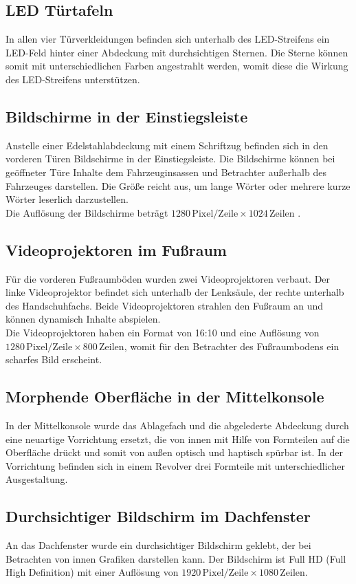 \subsection{LED Türtafeln}
In allen vier Türverkleidungen befinden sich unterhalb des LED-Streifens ein LED-Feld hinter einer Abdeckung mit durchsichtigen Sternen. Die Sterne können somit mit unterschiedlichen Farben angestrahlt werden, womit diese die Wirkung des LED-Streifens unterstützen. \\
\subsection{Bildschirme in der Einstiegsleiste}
Anstelle einer Edelstahlabdeckung mit einem Schriftzug befinden sich in den vorderen Türen Bildschirme in der Einstiegsleiste. Die Bildschirme können bei geöffneter Türe Inhalte dem Fahrzeuginsassen und Betrachter außerhalb des Fahrzeuges darstellen. Die Größe reicht aus, um lange Wörter oder mehrere kurze Wörter leserlich darzustellen. \\
Die Auflösung der Bildschirme beträgt $ 1280 \,\mathrm{Pixel}/\mathrm{Zeile} \times 1024 \,\mathrm{Zeilen} $ . 
\subsection{Videoprojektoren im Fußraum}
Für die vorderen Fußraumböden wurden zwei Videoprojektoren verbaut. Der linke Videoprojektor befindet sich unterhalb der Lenksäule, der rechte unterhalb des Handschuhfachs. Beide Videoprojektoren strahlen den Fußraum an und können dynamisch Inhalte abspielen. \\
Die Videoprojektoren haben ein Format von 16:10 und eine Auflösung von $ 1280\,\mathrm{Pixel}/\mathrm{Zeile} \times 800\,\mathrm{Zeilen} $, womit für den Betrachter des Fußraumbodens ein scharfes Bild erscheint.
\subsection{Morphende Oberfläche in der Mittelkonsole}
In der Mittelkonsole wurde das Ablagefach und die abgelederte Abdeckung durch eine neuartige Vorrichtung ersetzt, die von innen mit Hilfe von Formteilen auf die Oberfläche drückt und somit von außen optisch und haptisch spürbar ist. In der Vorrichtung befinden sich in einem Revolver drei Formteile mit unterschiedlicher Ausgestaltung.
\subsection{Durchsichtiger Bildschirm im Dachfenster}
An das Dachfenster wurde ein durchsichtiger Bildschirm geklebt, der bei Betrachten von innen Grafiken darstellen kann.
Der Bildschirm ist Full HD (Full High Definition) mit einer Auflösung von $ 1920 \,\mathrm{Pixel}/\mathrm{Zeile} \times 1080 \,\mathrm{Zeilen} $.
